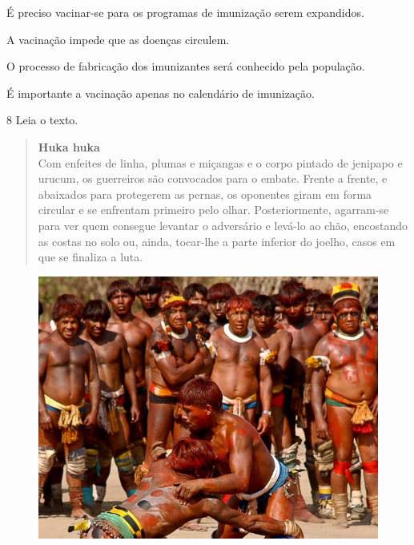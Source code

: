 \begin{escolha}
\item É preciso vacinar-se para os programas de imunização serem expandidos.

\item A vacinação impede que as doenças circulem.

\item O processo de fabricação dos imunizantes será conhecido pela população.

\item É importante a vacinação apenas no calendário de imunização.
\end{escolha}


\num{8}  Leia o texto.

\begin{quote}
\textbf{Huka huka}\\
Com enfeites de linha, plumas e miçangas e o corpo pintado de jenipapo e
urucum, os guerreiros são convocados para o embate. Frente a frente, e
abaixados para protegerem as pernas, os oponentes
giram em forma circular e se enfrentam primeiro pelo olhar.
Posteriormente, agarram-se para ver quem consegue levantar o adversário
e levá-lo ao chão, encostando as costas no solo ou, ainda, tocar-lhe a
parte inferior do joelho, casos em que se finaliza a luta.
\end{quote}

\begin{figure}[htpb!]
\includegraphics[width=\textwidth]{./imgs/art36.png}
\end{figure}\enlargethispage{2\baselineskip}

